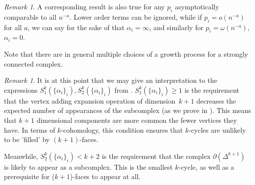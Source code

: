 \documentclass{article}
\theoremstyle{plain}
\theoremstyle{definition}
\theoremstyle{remark}
\newtheorem{remark}[theorem]{Remark}
\newcommand{\di}{dimension}
\begin{document}
\begin{remark}
    A corresponding result is also true for any $p_i$ asymptotically comparable to all $n^{-a}$. Lower order terms can be ignored, while if $p_i=o(n^{-a})$ for all $a$, we can say for the sake of  that $\alpha_i=\infty$, and similarly for $p_i=\omega(n^{-a})$, $\alpha_i=0$.
    
    Note that there are in general multiple choices of a growth process for a strongly connected complex. 
\end{remark}

\begin{remark}
    It is at this point that we may give an interpretation to the expressions $S^k _1(\{\alpha_i\}_i), S^k _2(\{\alpha_i\}_i)$ from . $S^k _1(\{\alpha_i\}_i)
    \geq 1$ is the requirement that the vertex adding expansion operation of \di\ $k+1$ decreases the expected number of appearances of the subcomplex (as we prove in ).
    This means that $k+1$ \di al components are more common the fewer vertices they have.
    In terms of $k$-cohomology, this condition ensures that $k$-cycles are unlikely to be 'filled' by $(k+1)$-faces.
    
    Meanwhile, $S^k _2(\{\alpha_i\}_i)<k+2$ is the requirement that the complex $\partial(\Delta^{k+1})$ is likely to appear as a subcomplex.
    This is the smallest $k$-cycle, as well as a prerequisite for ($k+1$)-faces to appear at all.
\end{remark}
\end{document}
